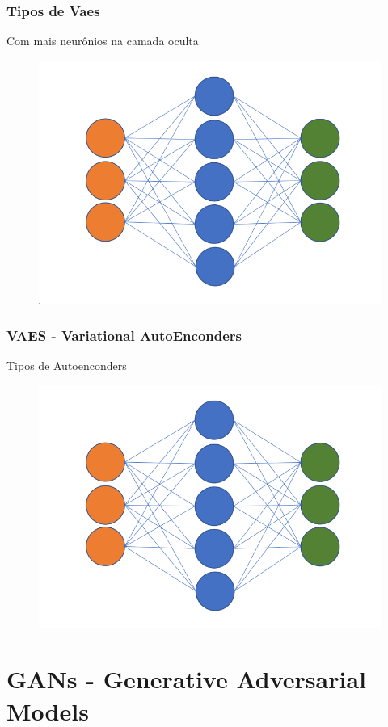 \documentclass{beamer}
\begin{document}
\begin{frame}
	\frametitle{Tipos de Vaes}
	\begin{block}{Com mais neurônios na camada oculta}
		\begin{figure}
			\centering
			\includegraphics[width=0.7\linewidth]{figures/vaes_archi1}
		\end{figure}
	\end{block}
\end{frame}
\begin{frame}
	\frametitle{VAES - Variational AutoEnconders}
	\begin{block}{Tipos de Autoenconders}
		\begin{figure}
			\centering
			\includegraphics[width=0.7\linewidth]{figures/vaes_archi1}
		\end{figure}
	\end{block}
\end{frame}
\section{GANs - Generative Adversarial Models}
\end{document}
